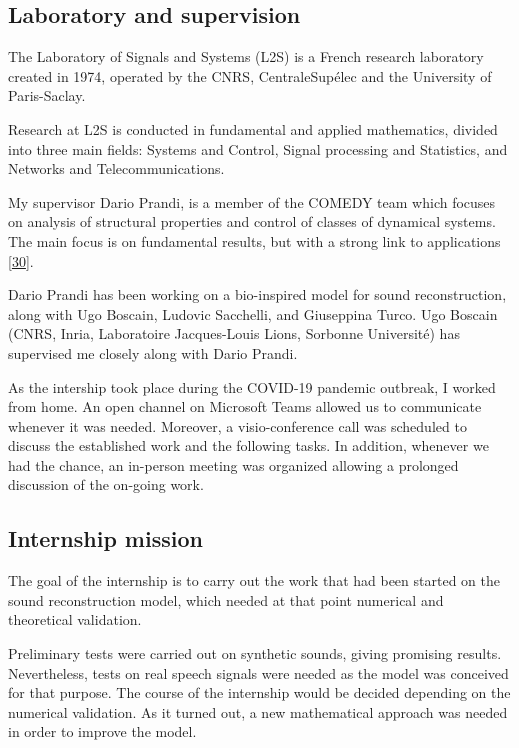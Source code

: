 \documentclass[american,]{article}
\theoremstyle{definition}
\theoremstyle{definition}
\theoremstyle{definition}
\theoremstyle{remark}
\begin{document}
\hypertarget{laboratory-and-supervision}{%
\subsection{Laboratory and supervision}\label{laboratory-and-supervision}}

The Laboratory of Signals and Systems (L2S) is a French
research laboratory created in 1974, operated by the CNRS,
CentraleSupélec and the University of Paris-Saclay.

Research at L2S is conducted in fundamental and applied mathematics,
divided into three main fields:
Systems and Control, Signal processing and Statistics,
and Networks and Telecommunications.

My supervisor Dario Prandi, is a member of the COMEDY team
which focuses on analysis of structural properties
and control of classes of dynamical systems.
The main focus is on fundamental results, but with a strong
link to applications {[}\protect\hyperlink{ref-l2s}{30}{]}.

Dario Prandi has been working on a bio-inspired model for sound
reconstruction, along with Ugo Boscain, Ludovic Sacchelli,
and Giuseppina Turco.
Ugo Boscain (CNRS, Inria, Laboratoire Jacques-Louis Lions,
Sorbonne Université) has supervised me closely along with Dario Prandi.

As the intership took place during the COVID-19 pandemic outbreak,
I worked from home.
An open channel on Microsoft Teams allowed us to communicate
whenever it was needed. Moreover, a visio-conference call
was scheduled to discuss the established work and the following tasks.
In addition, whenever we had the chance, an in-person meeting was organized
allowing a prolonged discussion of the on-going work.

\hypertarget{internship-mission}{%
\subsection{Internship mission}\label{internship-mission}}

The goal of the internship is to carry out the work that had been started
on the sound reconstruction model, which needed at that point
numerical and theoretical validation.

Preliminary tests were carried out on synthetic sounds, giving promising results.
Nevertheless, tests on real speech signals were needed as the model
was conceived for that purpose.
The course of the internship would be decided depending on the numerical validation.
As it turned out, a new mathematical approach was needed in order
to improve the model.
\end{document}
